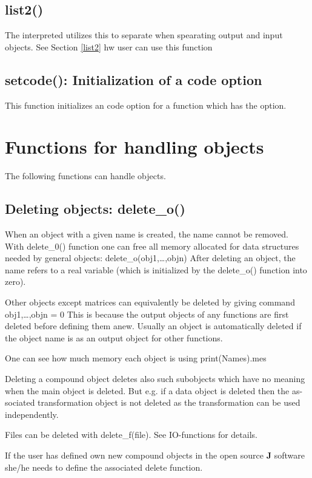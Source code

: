 \subsection{\textcolor{VioletRed}{list2}()}
\label{list20}
The interpreted utilizes this to separate when spearating output and input objects.
See Section \ref{list2} hw user can use this function
\subsection{setcode(): Initialization of a code option}
\label{setcode}
This function initializes an code option for a function which has the option.
\section{Functions for handling objects}
\label{objects}
The following functions can handle objects.
\subsection{Deleting objects: delete\_o()}
\label{delete}
When an object with a given name is created, the name cannot be removed. With
delete\_0() function one can free all memory allocated for data structures needed
by general objects:
delete\_o(obj1,…,objn)
After deleting an object, the name refers to a real variable (which is
initialized by the delete\_o() function into zero).
\begin{note}
Other objects except matrices can equivalently be deleted by giving
command
obj1,…,objn = 0
This is because the output objects of any functions are first deleted before
defining them anew. Usually an object is automatically deleted if the object
name is as an output object for other functions.
\end{note}
\begin{note}
One can see how much memory each object is using \textcolor{VioletRed}{print}(Names).mes
\end{note}
\begin{note}
Deleting a compound object deletes also such
subobjects which have no meaning when the main object is deleted. But e.g. if a
data object is deleted then the as-sociated transformation object is not
deleted as the transformation can be used independently.
\end{note}
\begin{note}
Files can be deleted with delete\_f(file). See IO-functions for
details.
\end{note}
\begin{note}
If the user has defined own new compound objects in the open source
\textbf{J} software she/he needs to define the associated delete function.
\end{note}
